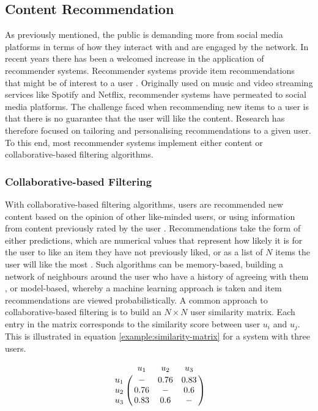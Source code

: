 \subsection{Content Recommendation}
As previously mentioned, the public is demanding more from social media platforms in terms of how they interact with and are engaged by the network. In recent years there has been a welcomed increase in the application of recommender systems. Recommender systems provide item recommendations that might be of interest to a user \cite{ricci2011introduction}. Originally used on music and video streaming services like Spotify and Netflix, recommender systems have permeated to social media platforms. The challenge faced when recommending new items to a user is that there is no guarantee that the user will like the content. Research has therefore focused on tailoring and personalising recommendations to a given user. To this end, most recommender systems implement either content or collaborative-based filtering algorithms.

\subsubsection{Collaborative-based Filtering} 
With collaborative-based filtering algorithms, users are recommended new content based on the opinion of other like-minded users, or using information from content previously rated by the user \cite{sarwar2001item}. Recommendations take the form of either predictions, which are numerical values that represent how likely it is for the user to like an item they have not previously liked, or as a list of $N$ items the user will like the most \cite{sarwar2001item}. Such algorithms can be memory-based, building a network of neighbours around the user who have a history of agreeing with them \cite{sarwar2001item}, or model-based, whereby a machine learning approach is taken and item recommendations are viewed probabilistically. A common approach to collaborative-based filtering is to build an $N \times N$ user similarity matrix. Each entry in the matrix corresponds to the similarity score between user $u_i$ and $u_j$. This is illustrated in equation \ref{example:similarity-matrix} for a system with three users. 

\begin{equation}
\bordermatrix{~ & u_1 & u_2 & u_3 \cr
            u_1 & - & 0.76 & 0.83 \cr
            u_2 & 0.76 & - & 0.6\cr
            u_3 & 0.83 & 0.6 & - \cr}
\label{example:similarity-matrix}
\end{equation}

